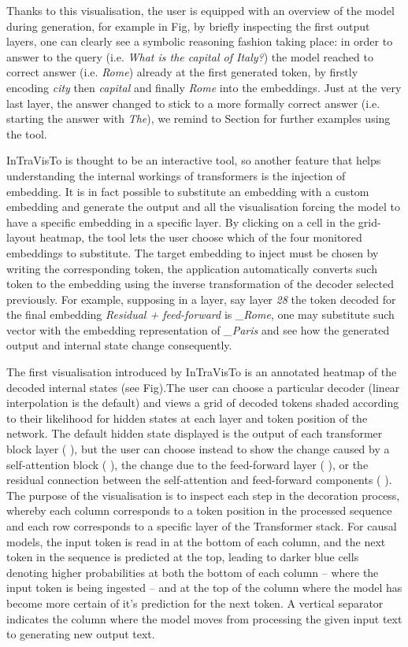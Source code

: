 {Thanks to this visualisation, the user is equipped with an overview of the model during generation, for example in Fig, by briefly inspecting the first output layers, one can clearly see a symbolic reasoning fashion taking place: in order to answer to the query (i.e. \textit{What is the capital of Italy?}) the model reached to correct answer (i.e. \textit{Rome}) already at the first generated token, by firstly encoding \textit{city} then \textit{capital} and finally \textit{Rome} into the embeddings.
Just at the very last layer, the answer changed to stick to a more formally correct answer (i.e. starting the answer with \textit{The}), we remind to Section for further examples using the tool.
    
InTraVisTo is thought to be an interactive tool, so another feature that helps understanding the internal workings of transformers is the injection of embedding.
It is in fact possible to substitute an embedding with a custom embedding and generate the output and all the visualisation forcing the model to have a specific embedding in a specific layer.
By clicking on a cell in the grid-layout heatmap, the tool lets the user choose which of the four monitored embeddings to substitute.
The target embedding to inject must be chosen by writing the corresponding token, the application automatically converts such token to the embedding using the inverse transformation of the decoder selected previously.
For example, supposing in a layer, say layer \emph{28} the token decoded for the final embedding \emph{Residual + feed-forward} is \emph{\_Rome}, one may substitute such vector with the embedding representation of \emph{\_Paris} and see how the generated output and internal state change consequently.
    
The first visualisation introduced by InTraVisTo is an annotated heatmap of the decoded internal states (see Fig).The user can choose a particular decoder (linear interpolation is the default) and views a grid of decoded tokens shaded according to their likelihood for hidden states at each layer and token position of the network.
The default hidden state displayed is the output of each transformer block layer (
), but the user can choose instead to show the change caused by a self-attention block (
), the change due to the feed-forward layer (
), or the residual connection between the self-attention and feed-forward components (
).
The purpose of the visualisation is to inspect each step in the decoration process, whereby each column corresponds to a token position in the processed sequence and each row corresponds to a specific layer of the Transformer stack.
For causal models, the input token is read in at the bottom of each column, and the next token in the sequence is predicted at the top, leading to darker blue cells denoting higher probabilities at both the bottom of each column -- where the input token is being ingested -- and at the top of the column where the model has become more certain of it's prediction for the next token.
A vertical separator indicates the column where the model moves from processing the given input text to generating new output text.
    
}
